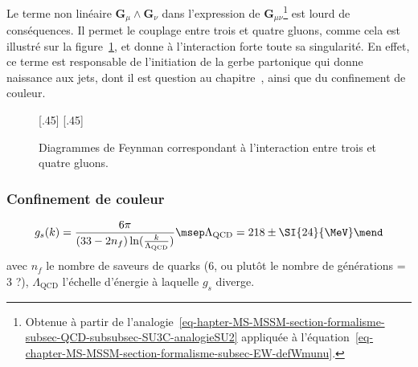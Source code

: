 \par Le terme non linéaire $\bm{G}_\mu\wedge\bm{G}_\nu$ dans l'expression de $\bm{G}_{\mu\nu}$\footnote{Obtenue à partir de l'analogie~\eqref{eq-hapter-MS-MSSM-section-formalisme-subsec-QCD-subsubsec-SU3C-analogieSU2} appliquée à l'équation~\eqref{eq-chapter-MS-MSSM-section-formalisme-subsec-EW-defWmunu}.} est lourd de conséquences.
Il permet le couplage entre trois et quatre gluons, comme cela est illustré sur la figure~\ref{fig-fgraph-QCD_3_et_4_gluons}, et donne à l'interaction forte toute sa singularité. En effet, ce terme est responsable de l'initiation de la gerbe partonique qui donne naissance aux jets, dont il est question au chapitre~, ainsi que du confinement de couleur.
\begin{figure}[h]
\centering
\vspace{\baselineskip}
\subcaptionbox{\label{subfig-fgraph-ggg}}[.45\textwidth]
{\vspace{\baselineskip}}
\hfill
\subcaptionbox{\label{subfig-fgraph-gggg}}[.45\textwidth]
{\vspace{\baselineskip}}

\caption{Diagrammes de Feynman correspondant à l'interaction entre trois et quatre gluons.}
\label{fig-fgraph-QCD_3_et_4_gluons}
\end{figure}
\subsubsection{Confinement de couleur}\label{chapter-MS-MSSM-section-formalisme-subsec-QCD-subsubsec-confinement}

\begin{equation}
g_s (k) = \frac{6\pi}{(33-2n_f)\ln(\frac{k}{\Lambda_\text{QCD}})}
\msep
\Lambda_\text{QCD} = 218\pm\SI{24}{\MeV}
\mend
\end{equation}
avec $n_f$ le nombre de saveurs de quarks (6, ou plutôt le nombre de générations = 3 ?), $\Lambda_\text{QCD}$ l'échelle d'énergie à laquelle $g_s$ diverge.

